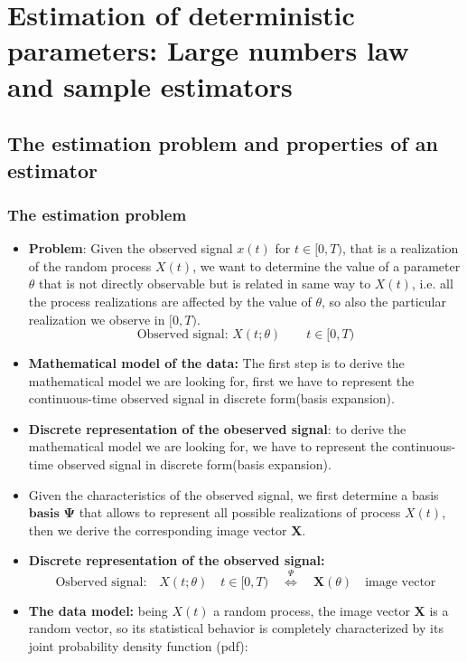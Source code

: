
\section{Estimation of deterministic parameters: Large numbers law and sample estimators}
\subsection{The estimation problem and properties of an estimator}
\subsubsection{The estimation problem}
\begin{itemize}
    \item \textbf{Problem}:
     Given the observed signal \(x(t)\) for \(t\in[0,T)\), that is a realization of the random process \(X(t)\), we want to determine the value of a parameter \(\theta\) that is not directly observable but is related in same way to \(X(t)\), i.e. all the process realizations are affected by the value of \(\theta\), so also the particular realization we observe in \([0,T)\).
     \[
     \text{Observed signal: }X(t;\theta)\qquad t\in[0,T)
     \]
     \item \textbf{Mathematical model of the data:} The first step is to derive the mathematical model we are looking for, first we have to represent the continuous-time observed signal in discrete form(basis expansion).
     \item \textbf{Discrete representation of the obeserved signal}: to derive the mathematical model we are looking for, we have to represent the continuous-time observed signal in discrete form(basis expansion).
     \item Given the characteristics of the observed signal, we first determine a basis \(\mathbf{basis}\) \(\mathbf{\Psi}\) that allows to represent all possible realizations of process \(X(t)\), then we derive the corresponding image vector \textbf{X}.
     \item \textbf{Discrete representation of the observed signal:}
    \[ \text{Osberved signal:} \quad X(t; \theta) \quad t \in [0, T) \quad \overset{\Psi}{\Longleftrightarrow} \quad \mathbf{X}(\theta) \quad \text{image vector}\]
    \item \textbf{The data model:} being \(X(t)\) a random process, the image vector \(\textbf{X}\) is a random vector, so its statistical behavior is completely characterized by its joint probability density function (pdf):
    \[
\]
\end{itemize}
